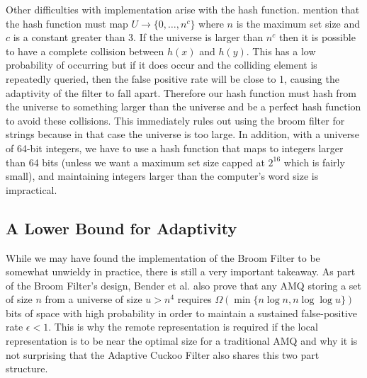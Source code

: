 \documentclass[../paper.tex]{subfiles}
\begin{document}
Other difficulties with implementation arise with the hash function. \cite{broom-filter}
mention that the hash function must map $U \rightarrow \{0,\ldots,n^c\}$ where
$n$ is the maximum set size and $c$ is a constant greater than 3. If the universe
is larger than $n^c$ then it is possible to have a complete collision between
$h(x)$ and $h(y)$. This has a low probability of occurring but if it does
occur and the colliding element is repeatedly queried, then the false positive
rate will be close to 1, causing the adaptivity of the filter to fall apart. Therefore
our hash function must hash from the universe to something larger than the universe
and be a perfect hash function to avoid these collisions. This immediately rules
out using the broom filter for strings because in that case the universe is too large.
In addition, with a universe of 64-bit integers, we have to use a hash function
that maps to integers larger than 64 bits (unless we want a maximum set size capped
at $2^{16}$ which is fairly small), and maintaining integers larger than the computer's
word size is impractical.

\subsection{A Lower Bound for Adaptivity} While we may have found the
implementation of the Broom Filter to be somewhat unwieldy in practice, there
is still a very important takeaway.  As part of the Broom Filter's design,
Bender et al. also prove that any AMQ storing a set of size $n$ from a universe
of size $u > n^4$ requires $\Omega (\min \{n\log n, n\log\log u\})$ bits of
space with high probability in order to maintain a sustained false-positive
rate $\epsilon < 1$.  This is why the remote representation is required if the
local representation is to be near the optimal size for a traditional AMQ and
why it is not surprising that the Adaptive Cuckoo Filter also shares this two
part structure.  
\end{document}
